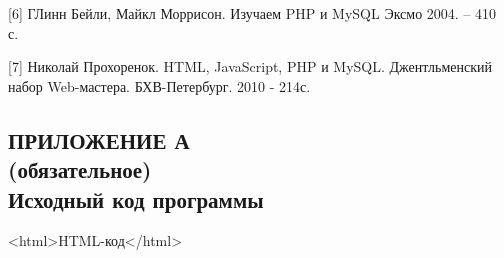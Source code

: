 \documentclass[14pt,a4paper]{extreport}
\begin{document}
\hspace{4ex}[6] ГЛинн Бейли, Майкл Моррисон. Изучаем PHP и MySQL Эксмо
2004. – 410 с.\

\hspace{4ex}[7] Николай Прохоренок. HTML, JavaScript, PHP и MySQL. Джентльменский набор Web-мастера. БХВ-Петербург. 2010 - 214с.\






	\begin{landscape}
	\newpage
	\section*{\center\normalsize ПРИЛОЖЕНИЕ А\\(обязательное)\\Исходный код программы \endcenter}
	<html>HTML-код</html>
	\end{landscape}
	
	
\end{document}
